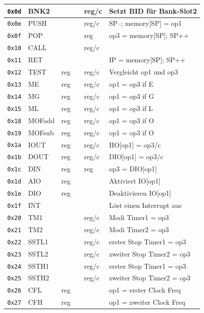 \documentclass{scrartcl}
\begin{document}
\begin{center}
\begin{longtable}{l | l l l l | l}
            \texttt{0x0d} & BNK2 &  &  & reg/c & Setzt BID für Bank-Slot2 \\
            \hline
            \texttt{0x0e} & PUSH &  &  & reg/c & SP--; memory[SP] = op1 \\
            \texttt{0x0f} & POP  &  &  & reg & op3 = memory[SP]; SP++ \\
            \texttt{0x10} & CALL &  &  & reg/c & \vtop{
				\hbox{\strut memory[SP] = IP; SP++;}
				\hbox{\strut IP = op3}} \\
            \texttt{0x11} & RET  &  &  &  & IP = memory[SP]; SP++ \\
            \hline
            \texttt{0x12} & TEST & reg &  & reg/c & Vergleicht op1 und op3 \\
            \texttt{0x13} & ME   & reg &  & reg/c & op1 = op3 if E \\
            \texttt{0x14} & MG   & reg &  & reg/c & op1 = op3 if G \\
            \texttt{0x15} & ML   & reg &  & reg/c & op1 = op3 if L \\
            \texttt{0x18} & MOFadd  & reg &  & reg/c & op1 = op3 if O \\
            \texttt{0x19} & MOFsub  & reg &  & reg/c & op1 = op3 if O \\
            \hline
            \texttt{0x1a} & IOUT & reg &  & reg/c & IIO[op1] = op3/c \\
            \texttt{0x1b} & DOUT & reg &  & reg/c & DIO[op1] = op3/c \\
            \texttt{0x1c} & DIN  & reg &  & reg & op3 = DIO[op1] \\
            \texttt{0x1d} & AIO  & reg &  &  & Aktiviert IO[op1] \\
            \texttt{0x1e} & DIO  & reg &  &  & Deaktivieren IO[op1] \\
            \hline
            \texttt{0x1f} & INT  & & & & Löst einen Interrupt aus \\
            \texttt{0x20} & TM1  & & & reg/c & Modi Timer1 = op3 \\
            \texttt{0x21} & TM2  & & & reg/c & Modi Timer2 = op3 \\
            \texttt{0x22} & SSTL1 & & & reg/c & erster Stop Timer1 = op3 \\
            \texttt{0x23} & SSTL2 & & & reg/c & zweiter Stop Timer2 = op3 \\
            \texttt{0x24} & SSTH1 & & & reg/c & erster Stop Timer1 = op3 \\
            \texttt{0x25} & SSTH2 & & & reg/c & zweiter Stop Timer2 = op3 \\
            \texttt{0x26} & CFL  & reg & & & op1 = erster Clock Freq \\
            \texttt{0x27} & CFH  & reg & & & op1 = zweiter Clock Freq
        \end{longtable}
    \end{center}
\end{document}
